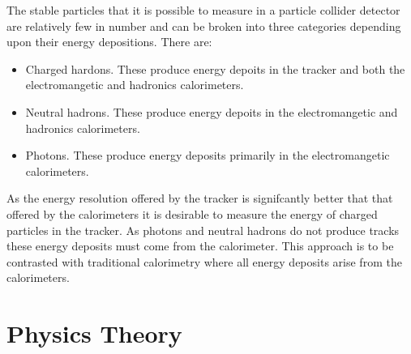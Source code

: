 The stable particles that it is possible to measure in a particle collider detector are relatively few in number and can be broken into three categories depending upon their energy depositions.  There are:

\begin{itemize}
\item Charged hardons.  These produce energy depoits in the tracker and both the electromangetic and hadronics calorimeters.
\item Neutral hadrons.  These produce energy depoits in the electromangetic and hadronics calorimeters.
\item Photons.  These produce energy deposits primarily in the electromangetic calorimeters. 
\end{itemize}

As the energy resolution offered by the tracker is signifcantly better that that offered by the calorimeters it is desirable to measure the energy of charged particles in the tracker.  As photons and neutral hadrons do not produce tracks these energy deposits must come from the calorimeter.  This approach is to be contrasted with traditional calorimetry where all energy deposits arise from the calorimeters.  


\section{Physics Theory }
